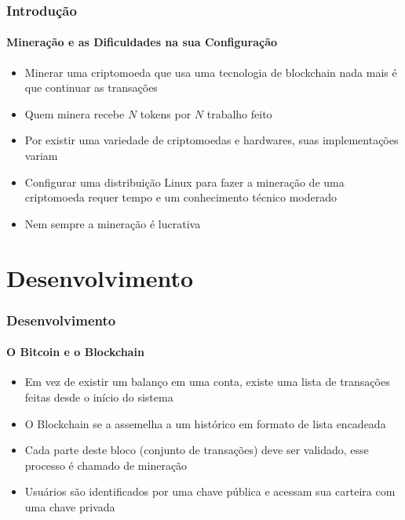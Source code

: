 \documentclass[aspectratio=43]{beamer}
\begin{document}
\begin{frame}
    \frametitle{Introdução}
    \framesubtitle{Mineração e as Dificuldades na sua Configuração}
    
    \begin{itemize}
        \item Minerar uma criptomoeda que usa uma tecnologia de blockchain
            nada mais é que continuar as transações

        \item Quem minera recebe $N$ tokens por $N$ trabalho
            feito

        \item Por existir uma variedade de criptomoedas e hardwares,
            suas implementações variam

        \item Configurar uma distribuição Linux para fazer a mineração
            de uma criptomoeda requer tempo e um conhecimento técnico
            moderado
        
        \item Nem sempre a mineração é lucrativa
    \end{itemize}
\end{frame}

\section[Desenvolvi\ldots]{Desenvolvimento}

\begin{frame}
    \frametitle{Desenvolvimento}
    \framesubtitle{O Bitcoin e o Blockchain}
    
    \begin{itemize}
        \item Em vez de existir um balanço em uma conta, existe uma lista de
            transações feitas desde o início do sistema
            \cite{Weber2012}

        \item O Blockchain se a assemelha a um histórico em formato de
            lista encadeada

        \item Cada parte deste bloco (conjunto de transações) deve ser
            validado, esse processo é chamado de mineração
            \cite{LChicarino}

        \item Usuários são identificados por uma chave pública e
            acessam sua carteira com uma chave privada
        
    \end{itemize}
\end{frame}
\end{document}
